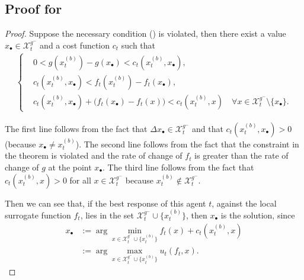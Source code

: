 \subsection{Proof for }
\begin{proof}
Suppose the necessary condition () is violated, then there exist a value $x_\bullet \in \mathcal{X}_t^{g^{-}}$ and a cost function $c_t$ such that
\begin{align}
\left\{\begin{aligned}
&0 < g(x_t^{(b)}) - g(x_\bullet) < c_t(x_t^{(b)}, x_\bullet),
\\
&c_t(x_t^{(b)}, x_\bullet) < f_t(x_t^{(b)}) - f_t(x_\bullet),
\\
&c_t(x_t^{(b)},x_\bullet) + \Big(f_t(x_\bullet)-f_t(x)\Big) < c_t(x_t^{(b)},x)\quad \forall x \in\mathcal{X}_t^{g^{-}}\setminus\{x_\bullet\}.
\end{aligned}\right.
\end{align}

The first line follows from the fact that $\Delta x_\bullet\in\mathcal{X}_t^{g^{-}}$ and that $c_t(x_t^{(b)},x_\bullet)>0$ (because $x_\bullet\neq x_t^{(b)}$). The second line follows from the fact that the constraint in the theorem is violated and the rate of change of $f_t$ is greater than the rate of change of $g$ at the point $x_\bullet$. The third line follows from the fact that $c_t(x_t^{(b)}, x)>0$ for all $x\in\mathcal{X}_t^{g^{-}}$ because $x_t^{(b)}\not\in\mathcal{X}_t^{g^{-}}$.




Then we can see that, if the best response of this agent $t$, against the local surrogate function $f_t$, lies in the set $\mathcal{X}_{t}^{g^{-}}\cup\{x_t^{(b)}\}$, then $x_\bullet$ is the solution, since
\begin{align}
x_\bullet &:= \arg\min_{x\in\mathcal{X}_{t}^{g^{-}}\cup\{x_t^{(b)}\}} f_t(x) + c_t(x_t^{(b)},x)
\\
&:= \arg\max_{x\in\mathcal{X}_{t}^{g^{-}}\cup\{x_t^{(b)}\}} u_t(f_t,x)
.
\end{align}


\end{proof}
